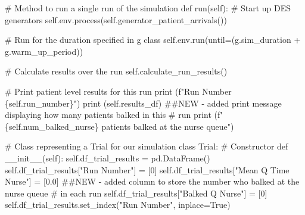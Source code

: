\documentclass[
  letterpaper,
  DIV=11,
  numbers=noendperiod]{scrreprt}
\newenvironment{Shaded}{}{}
\newcommand{\BuiltInTok}[1]{\textcolor[rgb]{0.84,0.23,0.29}{#1}}
\newcommand{\CommentTok}[1]{\textcolor[rgb]{0.42,0.45,0.49}{#1}}
\newcommand{\DecValTok}[1]{\textcolor[rgb]{0.00,0.36,0.77}{#1}}
\newcommand{\FloatTok}[1]{\textcolor[rgb]{0.00,0.36,0.77}{#1}}
\newcommand{\FunctionTok}[1]{\textcolor[rgb]{0.44,0.26,0.76}{#1}}
\newcommand{\KeywordTok}[1]{\textcolor[rgb]{0.84,0.23,0.29}{#1}}
\newcommand{\NormalTok}[1]{\textcolor[rgb]{0.14,0.16,0.18}{#1}}
\newcommand{\OperatorTok}[1]{\textcolor[rgb]{0.14,0.16,0.18}{#1}}
\newcommand{\SpecialCharTok}[1]{\textcolor[rgb]{0.00,0.36,0.77}{#1}}
\newcommand{\SpecialStringTok}[1]{\textcolor[rgb]{0.01,0.18,0.38}{#1}}
\newcommand{\StringTok}[1]{\textcolor[rgb]{0.01,0.18,0.38}{#1}}
\newcommand{\VariableTok}[1]{\textcolor[rgb]{0.89,0.38,0.04}{#1}}
\begin{document}
\begin{tcolorbox}
\begin{Shaded}
\begin{Highlighting}[]
    \CommentTok{\# Method to run a single run of the simulation}
    \KeywordTok{def}\NormalTok{ run(}\VariableTok{self}\NormalTok{):}
        \CommentTok{\# Start up DES generators}
        \VariableTok{self}\NormalTok{.env.process(}\VariableTok{self}\NormalTok{.generator\_patient\_arrivals())}

        \CommentTok{\# Run for the duration specified in g class}
        \VariableTok{self}\NormalTok{.env.run(until}\OperatorTok{=}\NormalTok{(g.sim\_duration }\OperatorTok{+}\NormalTok{ g.warm\_up\_period))}

        \CommentTok{\# Calculate results over the run}
        \VariableTok{self}\NormalTok{.calculate\_run\_results()}

        \CommentTok{\# Print patient level results for this run}
        \BuiltInTok{print}\NormalTok{ (}\SpecialStringTok{f"Run Number }\SpecialCharTok{\{}\VariableTok{self}\SpecialCharTok{.}\NormalTok{run\_number}\SpecialCharTok{\}}\SpecialStringTok{"}\NormalTok{)}
        \BuiltInTok{print}\NormalTok{ (}\VariableTok{self}\NormalTok{.results\_df)}
        \CommentTok{\#\#NEW {-} added print message displaying how many patients balked in this}
        \CommentTok{\# run}
        \BuiltInTok{print}\NormalTok{ (}\SpecialStringTok{f"}\SpecialCharTok{\{}\VariableTok{self}\SpecialCharTok{.}\NormalTok{num\_balked\_nurse}\SpecialCharTok{\}}\SpecialStringTok{ patients balked at the nurse queue"}\NormalTok{)}

\CommentTok{\# Class representing a Trial for our simulation}
\KeywordTok{class}\NormalTok{ Trial:}
    \CommentTok{\# Constructor}
    \KeywordTok{def}  \FunctionTok{\_\_init\_\_}\NormalTok{(}\VariableTok{self}\NormalTok{):}
        \VariableTok{self}\NormalTok{.df\_trial\_results }\OperatorTok{=}\NormalTok{ pd.DataFrame()}
        \VariableTok{self}\NormalTok{.df\_trial\_results[}\StringTok{"Run Number"}\NormalTok{] }\OperatorTok{=}\NormalTok{ [}\DecValTok{0}\NormalTok{]}
        \VariableTok{self}\NormalTok{.df\_trial\_results[}\StringTok{"Mean Q Time Nurse"}\NormalTok{] }\OperatorTok{=}\NormalTok{ [}\FloatTok{0.0}\NormalTok{]}
        \CommentTok{\#\#NEW {-} added column to store the number who balked at the nurse queue}
        \CommentTok{\# in each run}
        \VariableTok{self}\NormalTok{.df\_trial\_results[}\StringTok{"Balked Q Nurse"}\NormalTok{] }\OperatorTok{=}\NormalTok{ [}\DecValTok{0}\NormalTok{]}
        \VariableTok{self}\NormalTok{.df\_trial\_results.set\_index(}\StringTok{"Run Number"}\NormalTok{, inplace}\OperatorTok{=}\VariableTok{True}\NormalTok{)}


\end{Highlighting}
\end{Shaded}
\end{tcolorbox}
\end{document}
